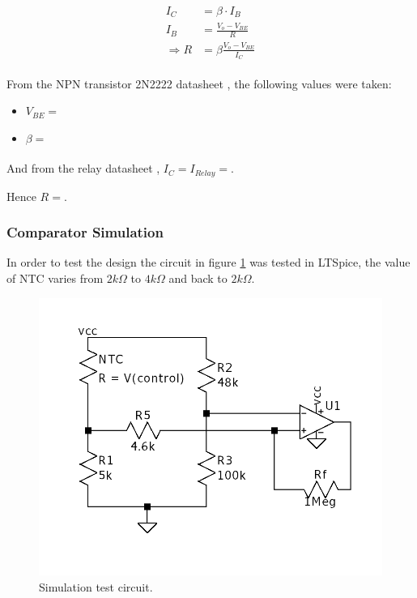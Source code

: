 \begin{equation}
    \begin{aligned}
        I_C &= \beta \cdot I_B\\
        I_B &= \frac{V_o - V_{BE}}{R}\\ 
        \Rightarrow R &= \beta \frac{V_o - V_{BE}}{I_C}
    \end{aligned}
\end{equation}

From the NPN transistor 2N2222 datasheet \textsuperscript{\cite{2N2222_datasheet}}, the following values were taken:
\begin{itemize}
    \item $V_{BE} = $
    \item $\beta = $
\end{itemize}
And from the relay datasheet \textsuperscript{\cite{ST2-DC5V-F_datasheet}}, $I_C = I_{Relay} = $.

Hence $R = $.

\subsubsection{Comparator Simulation}

In order to test the design the circuit in figure \ref{fig:TestCirc} was tested in LTSpice, the value of NTC varies from $2k\Omega$ to $4k\Omega$ and back to $2k\Omega$.

\begin{figure}[H]
    \centering
    \includegraphics*[scale = 0.4]{Images/CompSimCirc.png}
    \caption{Simulation test circuit.}
    \label{fig:TestCirc}
\end{figure}

